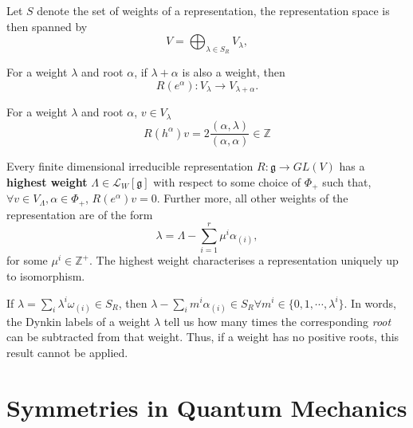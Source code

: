 \documentclass[11pt,final]{article}
\begin{document}
\begin{prop}
\begin{ronumerate}
\item Let $S$ denote the set of weights of a representation, the representation space is then spanned by
\begin{equation}\label{eq:CrudeWeightSpan}
V = \bigoplus_{\lambda \in S_R} V_\lambda,
\end{equation}
\item For a weight $\lambda$ and root $\alpha$, if $\lambda + \alpha$ is also a weight, then
\begin{equation}
R(e^\alpha) : V_\lambda \to V_{\lambda + \alpha}.
\end{equation}
\item For a weight $\lambda$ and root $\alpha$, $v \in V_\lambda$
\begin{equation}
R(h^\alpha)v = 2\frac{(\alpha, \lambda)}{(\alpha, \alpha)} \in \mathbb{Z}
\end{equation}
\end{ronumerate}
\end{prop}

\begin{prop}
Every finite dimensional irreducible representation $R:\mathfrak{g} \to GL(V)$ has a \textbf{highest weight} $\Lambda \in \mathcal{L}_W[\mathfrak{g}]$ with respect to some choice of $\Phi_+$ such that, $\forall v \in V_{\Lambda}, \alpha \in \Phi_+$, $R(e^\alpha) v = 0$. Further more, all other weights of the representation are of the form
\begin{equation}\label{eq:weightSpan}
\lambda = \Lambda - \sum_{i=1}^r \mu^i \alpha_{(i)},
\end{equation}
for some $\mu^i \in \mathbb{Z}^+$. The highest weight characterises a representation uniquely up to isomorphism.
\end{prop}

\begin{prop}
If $\lambda = \sum_i \lambda^i \omega_{(i)} \in S_R$, then $\lambda - \sum_i m^i \alpha_{(i)} \in S_R \forall m^i \in \{0, 1, \cdots, \lambda^i \}$. In words, the Dynkin labels of a weight $\lambda$ tell us how many times the corresponding \textit{root} can be subtracted from that weight. Thus, if a weight has no positive roots, this result cannot be applied.
\end{prop}

\section{Symmetries in Quantum Mechanics}
\end{document}
